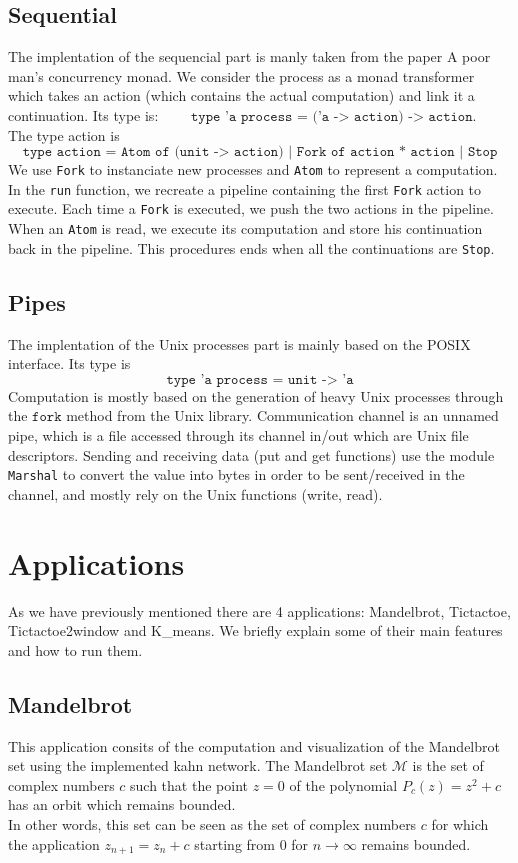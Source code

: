 \documentclass[10pt,a4paper]{article}
\begin{document}
\subsection{Sequential}
The implentation of the sequencial part is manly taken from the paper A poor man’s concurrency monad. We consider the process as a monad transformer which takes an action (which contains the actual computation) and link it a continuation. Its type is: $\quad \quad \texttt{type 'a process = ('a -> action) -> action}$.
\\The type action is $$\texttt{type action = Atom of (unit -> action) | Fork of action * action | Stop}$$
We use \texttt{Fork} to instanciate new processes and \texttt{Atom} to represent a computation.\\
In the \texttt{run} function, we recreate a pipeline containing the first \texttt{Fork} action to execute. Each time a \texttt{Fork} is executed, we push the two actions in the pipeline. When an \texttt{Atom} is read, we execute its computation and store his continuation back in the pipeline. This procedures ends when all the continuations are \texttt{Stop}.

\subsection{Pipes}

The implentation of the Unix processes part is mainly based on the POSIX interface. Its type is $$\texttt{type 'a process = unit -> 'a}$$
Computation is mostly based on the generation of heavy Unix processes through the $\texttt{fork}$ method from the Unix library.
Communication channel is an unnamed pipe, which is a file accessed through its channel in/out which are Unix file descriptors. Sending and receiving data (put and get functions) use the module \texttt{Marshal} to convert the value into bytes in order to be sent/received in the channel, and mostly rely on the Unix functions (write, read).

\section{Applications}
As we have previously mentioned there are 4 applications: Mandelbrot, Tictactoe, Tictactoe2window and K\_means. We briefly explain some of their main features and how to run them.
\subsection{Mandelbrot}
This application consits of the computation and visualization of the Mandelbrot set using the implemented kahn network.
The Mandelbrot set $\mathcal{M}$ is the set of complex numbers $c$ such that the point $z = 0$ of the polynomial $P_c(z) = z^2 + c$ has an orbit which remains bounded. \\
In other words, this set can be seen as the set of complex numbers $c$ for which the application $z_{n+1} = z_n + c$ starting from $0$ for $n \rightarrow \infty$ remains bounded.
\end{document}
